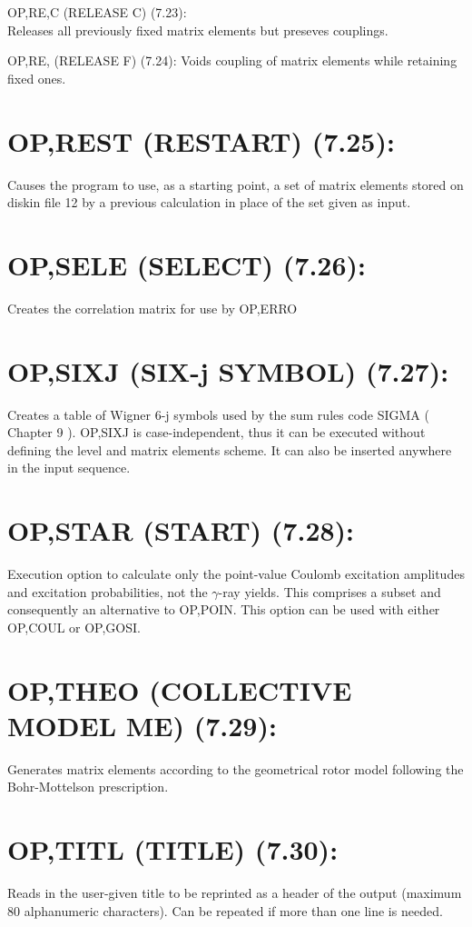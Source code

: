 \documentclass[10pt]{article}
\begin{document}
OP,RE,C (RELEASE C) (7.23):\\
Releases all previously fixed matrix elements but preseves couplings.

OP,RE, (RELEASE F) (7.24): Voids coupling of matrix elements while retaining fixed ones.

\section*{OP,REST (RESTART) (7.25):}
Causes the program to use, as a starting point, a set of matrix elements stored on diskin file 12 by a previous calculation in place of the set given as input.

\section*{OP,SELE (SELECT) (7.26):}
Creates the correlation matrix for use by OP,ERRO

\section*{OP,SIXJ (SIX-j SYMBOL) (7.27):}
Creates a table of Wigner 6-j symbols used by the sum rules code SIGMA ( Chapter 9 ). OP,SIXJ is case-independent, thus it can be executed without defining the level and matrix elements scheme. It can also be inserted anywhere in the input sequence.

\section*{OP,STAR (START) (7.28):}
Execution option to calculate only the point-value Coulomb excitation amplitudes and excitation probabilities, not the $\gamma$-ray yields. This comprises a subset and consequently an alternative to OP,POIN. This option can be used with either OP,COUL or OP,GOSI.

\section*{OP,THEO (COLLECTIVE MODEL ME) (7.29):}
Generates matrix elements according to the geometrical rotor model following the Bohr-Mottelson prescription.

\section*{OP,TITL (TITLE) (7.30):}
Reads in the user-given title to be reprinted as a header of the output (maximum 80 alphanumeric characters). Can be repeated if more than one line is needed.
\end{document}
